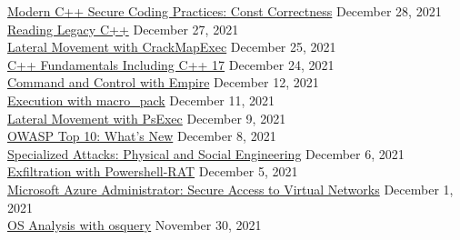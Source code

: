\documentclass[10pt]{res} %
\begin{document}
\begin{resume}
\href{https://bjdelacruz.dev/files/certificates/pluralsight/Modern_C_Secure_Coding_Practices_Const_Correctness.pdf}{\color{blue}Modern C++ Secure Coding Practices: Const Correctness} \hfill December 28, 2021 \\
\href{https://bjdelacruz.dev/files/certificates/pluralsight/Reading_Legacy_C.pdf}{\color{blue}Reading Legacy C++} \hfill December 27, 2021 \\
\href{https://bjdelacruz.dev/files/certificates/pluralsight/48_Lateral_Movement_with_CrackMapExec.pdf}{\color{blue}Lateral Movement with CrackMapExec} \hfill December 25, 2021 \\
\href{https://bjdelacruz.dev/files/certificates/pluralsight/C_Fundamentals_Including_C_17.pdf}{\color{blue}C++ Fundamentals Including C++ 17} \hfill December 24, 2021 \\
\href{https://bjdelacruz.dev/files/certificates/pluralsight/54_Command_and_Control_with_Empire.pdf}{\color{blue}Command and Control with Empire} \hfill December 12, 2021 \\
\href{https://bjdelacruz.dev/files/certificates/pluralsight/20_Execution_with_macro_pack.pdf}{\color{blue}Execution with macro\_pack} \hfill December 11, 2021 \\
\href{https://bjdelacruz.dev/files/certificates/pluralsight/46_Lateral_Movement_with_PsExec.pdf}{\color{blue}Lateral Movement with PsExec} \hfill December 9, 2021 \\
\href{https://bjdelacruz.dev/files/certificates/pluralsight/OWASP_Top_10_Whats_New.pdf}{\color{blue}OWASP Top 10: What's New} \hfill December 8, 2021 \\
\href{https://bjdelacruz.dev/files/certificates/pluralsight/Specialized_Attacks_Physical_and_Social_Engineering.pdf}{\color{blue}Specialized Attacks: Physical and Social Engineering} \hfill December 6, 2021 \\
\href{https://bjdelacruz.dev/files/certificates/pluralsight/60_Exfiltration_with_Powershell_RAT.pdf}{\color{blue}Exfiltration with Powershell-RAT} \hfill December 5, 2021 \\
\href{https://bjdelacruz.dev/files/certificates/pluralsight/18_Microsoft_Azure_Administrator_Secure_Access_to_Virtual_Networks.pdf}{\color{blue}Microsoft Azure Administrator: Secure Access to Virtual Networks} \hfill December 1, 2021 \\
\href{https://bjdelacruz.dev/files/certificates/pluralsight/11_OS_Analysis_with_osquery.pdf}{\color{blue}OS Analysis with osquery} \hfill November 30, 2021 \\

\end{resume}
\end{document}

